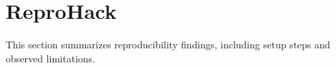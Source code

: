 \section{ReproHack}

This section summarizes reproducibility findings, including setup steps and observed limitations.
